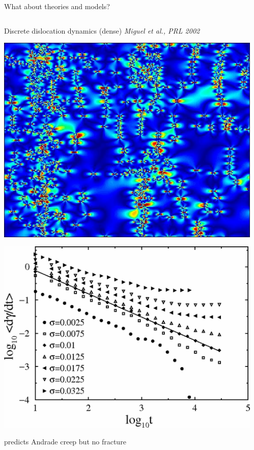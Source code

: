 \begin{frame}{What about theories and models?}
\begin{columns}
\begin{block}{Discrete dislocation dynamics (dense)}
\textit{\footnotesize Miguel et al., PRL 2002}

\hspace{1em}\includegraphics[width=\textwidth-2em]{Miguel_2002_img}

\medskip
\hspace{1em}\includegraphics[width=\textwidth-2em]{Miguel_2002_graph}

predicts Andrade creep \alert{but} no fracture
\end{block}
\begin{columns}


\end{columns}
\end{columns}
\end{frame}
